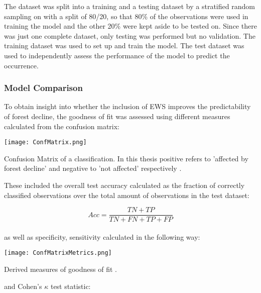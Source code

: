The dataset was split into a training and a testing dataset by a stratified random sampling on with a split of 80/20, so that 80\% of the observations were used in training the model and the other 20\% were kept aside to be tested on. Since there was just one complete dataset, only testing was performed but no validation. The training dataset was used to set up and train the model. The test dataset was used to independently assess the performance of the model to predict the occurrence.\\


\subsubsection{Model Comparison}
To obtain insight into whether the inclusion of EWS improves the predictability of forest decline, the goodness of fit was assessed using different measures calculated from the confusion matrix:

\begin{table}[H]
	\centering
	\texttt{[image: ConfMatrix.png]}
	\caption{Confusion Matrix of a classification. In this thesis positive refers to 'affected by forest decline' and negative to 'not affected' respectively \citep{james2013}.}\label{methods:conf_matrix}
\end{table}

These included the overall test accuracy calculated as the fraction of correctly classified observations over the total amount of observations in the test dataset:

\begin{equation}
	Acc = \frac{TN + TP}{TN + FN + TP + FP}
\end{equation}\\

as well as specificity, sensitivity calculated in the following way:

\begin{table}[H]
	\centering
	\texttt{[image: ConfMatrixMetrics.png]}
	\caption{Derived measures of goodness of fit \citep{james2013}.}\label{methods:conf_matrix_metrics}
\end{table}

and Cohen's $\kappa$ test statistic:

